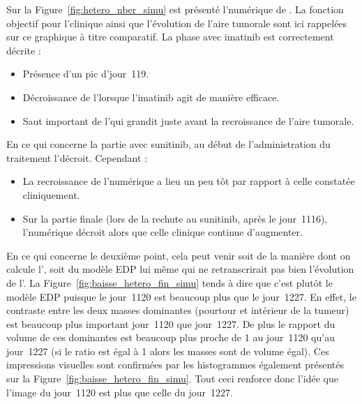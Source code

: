 \documentclass[main.tex]{subfiles}
\begin{document}
Sur la Figure~\ref{fig:hetero_nber_simu} est présenté l'\hetero numérique de \Nber.
La fonction objectif pour l'\hetero clinique ainsi que l'évolution de l'aire tumorale sont ici rappelées sur ce graphique à titre comparatif. La phase avec imatinib est  correctement décrite :
\begin{itemize}
\item Présence d'un pic d'\hetero jour~119.
\item Décroissance de l'\hetero lorsque l'imatinib agit de manière efficace.
\item Saut important de l'\hetero qui grandit juste avant la recroissance de l'aire tumorale.
\end{itemize}
En ce qui concerne la partie avec sunitinib, au début de l'administration du traitement l'\hetero décroit. Cependant :
\begin{itemize}
\item La recroissance de l'\hetero numérique a lieu un peu tôt par rapport à celle constatée cliniquement.
\item Sur la partie finale (lors de la rechute au sunitinib, après le jour~1116), l'\hetero numérique décroit alors que celle clinique continue d'augmenter. 
\end{itemize}
En ce qui concerne le deuxième point, cela peut venir soit de la manière dont on calcule l'\hetero, soit du modèle EDP lui même qui ne retranscrirait pas bien l'évolution de l'\hetero. La Figure~\ref{fig:baisse_hetero_fin_simu} tends à dire que c'est plutôt le modèle EDP puisque le jour~1120 est beaucoup plus \hetero que le 
jour~1227. En effet, le contraste entre les deux masses dominantes (pourtour et intérieur de la tumeur) 
est beaucoup plus important jour~1120 que jour~1227. De plus le rapport du volume de ces dominantes est beaucoup plus proche de 1 au jour~1120 qu'au jour~1227 (si le ratio est égal à 1 alors les masses sont de volume égal). Ces impressions visuelles sont confirmées par les histogrammes également présentés sur la Figure~\ref{fig:baisse_hetero_fin_simu}. 
Tout ceci renforce donc l'idée que l'image du jour~1120 est plus \hetero que celle du jour~1227.
\end{document}
